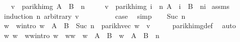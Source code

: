 \begin{isabellebody}
\ \ \ {\isachardoublequoteopen}v\ {\isasymin}\ parikh{\isacharunderscore}{\kern0pt}img\ {\isacharparenleft}{\kern0pt}{\isacharparenleft}{\kern0pt}A\ {\isasymunion}\ B{\isacharparenright}{\kern0pt}\ {\isacharcircum}{\kern0pt}{\isacharcircum}{\kern0pt}\ n{\isacharparenright}{\kern0pt}{\isachardoublequoteclose}\isanewline
\ \ \ \ \ {\isachardoublequoteopen}v\ {\isasymin}\ parikh{\isacharunderscore}{\kern0pt}img\ {\isacharparenleft}{\kern0pt}{\isasymUnion}i\ {\isasymle}\ n{\isachardot}{\kern0pt}\ A\ {\isacharcircum}{\kern0pt}{\isacharcircum}{\kern0pt}\ i\ {\isacharat}{\kern0pt}{\isacharat}{\kern0pt}\ B\ {\isacharcircum}{\kern0pt}{\isacharcircum}{\kern0pt}\ {\isacharparenleft}{\kern0pt}n{\isacharminus}{\kern0pt}i{\isacharparenright}{\kern0pt}{\isacharparenright}{\kern0pt}{\isachardoublequoteclose}\isanewline
%
\isadelimproof
%
\endisadelimproof
%
\isatagproof
{}\isamarkupfalse%
\ assms\ \isamarkupfalse%
\ {\isacharparenleft}{\kern0pt}induction\ n\ arbitrary{\isacharcolon}{\kern0pt}\ v{\isacharparenright}{\kern0pt}\isanewline
\ \ \isamarkupfalse%
\ {}\isanewline
\ \ \isamarkupfalse%
\ \isamarkupfalse%
\ {\isacharquery}{\kern0pt}case\ \isamarkupfalse%
\ simp\isanewline
{}\isamarkupfalse%
\isanewline
\ \ \isamarkupfalse%
\ {\isacharparenleft}{\kern0pt}Suc\ n{\isacharparenright}{\kern0pt}\isanewline
\ \ \isamarkupfalse%
\ \isamarkupfalse%
\ w\ \ w{\isacharunderscore}{\kern0pt}intro{\isacharcolon}{\kern0pt}\ {\isachardoublequoteopen}w\ {\isasymin}\ {\isacharparenleft}{\kern0pt}A\ {\isasymunion}\ B{\isacharparenright}{\kern0pt}\ {\isacharcircum}{\kern0pt}{\isacharcircum}{\kern0pt}\ {\isacharparenleft}{\kern0pt}Suc\ n{\isacharparenright}{\kern0pt}\ {\isasymand}\ parikh{\isacharunderscore}{\kern0pt}vec\ w\ {\isacharequal}{\kern0pt}\ v{\isachardoublequoteclose}\isanewline
\ \ \ \ \isamarkupfalse%
\ parikh{\isacharunderscore}{\kern0pt}img{\isacharunderscore}{\kern0pt}def\ \isamarkupfalse%
\ auto\isanewline
\ \ \isamarkupfalse%
\ \isamarkupfalse%
\ w{}\ w{}\ \ w{}{\isacharunderscore}{\kern0pt}w{}{\isacharunderscore}{\kern0pt}intro{\isacharcolon}{\kern0pt}\ {\isachardoublequoteopen}w\ {\isacharequal}{\kern0pt}\ w{}{\isacharat}{\kern0pt}w{}\ {\isasymand}\ w{}\ {\isasymin}\ A\ {\isasymunion}\ B\ {\isasymand}\ w{}\ {\isasymin}\ {\isacharparenleft}{\kern0pt}A\ {\isasymunion}\ B{\isacharparenright}{\kern0pt}\ {\isacharcircum}{\kern0pt}{\isacharcircum}{\kern0pt}\ n{\isachardoublequoteclose}\ \isamarkupfalse%

\end{isabellebody}
